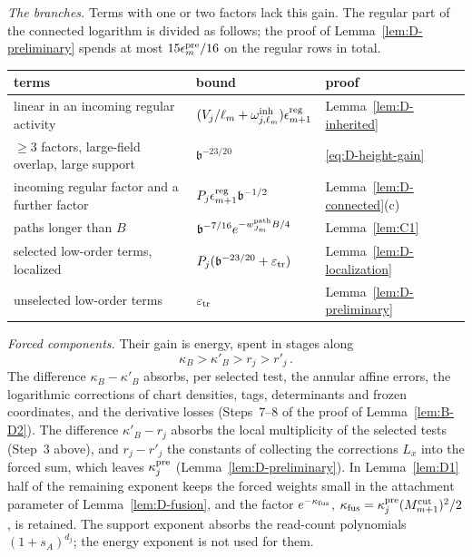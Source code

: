 \emph{The branches.} Terms with one or two factors lack this gain. The regular part of the connected logarithm is divided as follows; the proof of Lemma~\ref{lem:D-preliminary} spends at most $15\epsilon^{\rm pre}_m/16$ on the regular rows in total.
\begin{center}\small
\begin{tabular}{l|l|l}
terms & bound & proof\\\hline
linear in an incoming regular activity & $(V_j/\ell_m+\omega^{\rm inh}_{j,\ell_m})\epsilon^{\rm reg}_{m+1}$ & Lemma~\ref{lem:D-inherited}\\
$\ge3$ factors, large-field overlap, large support & $\mathfrak b^{-23/20}$ & \eqref{eq:D-height-gain}\\
incoming regular factor and a further factor & $P_j\epsilon^{\rm reg}_{m+1}\mathfrak b^{-1/2}$ & Lemma~\ref{lem:D-connected}(c)\\
paths longer than $B$ & $\mathfrak b^{-7/16}e^{-w^{\rm path}_{J_m}B/4}$ & Lemma~\ref{lem:C1}\\
selected low-order terms, localized & $P_j(\mathfrak b^{-23/20}+\varepsilon_{\rm tr})$ & Lemma~\ref{lem:D-localization}\\
unselected low-order terms & $\varepsilon_{\rm tr}$ & Lemma~\ref{lem:D-preliminary}
\end{tabular}
\end{center}

\emph{Forced components.} Their gain is energy, spent in stages along
\begin{equation*}
\kappa_B>\kappa'_B>r_j>r'_j\,.
\end{equation*}
The difference $\kappa_B-\kappa'_B$ absorbs, per selected test, the annular affine errors, the logarithmic corrections of chart densities, tags, determinants and frozen coordinates, and the derivative losses (Steps~7--8 of the proof of Lemma~\ref{lem:B-D2}). The difference $\kappa'_B-r_j$ absorbs the local multiplicity of the selected tests (Step~3 above), and $r_j-r'_j$ the constants of collecting the corrections $L_x$ into the forced sum, which leaves $\kappa_j^{\rm pre}$ (Lemma~\ref{lem:D-preliminary}). In Lemma~\ref{lem:D1} half of the remaining exponent keeps the forced weights small in the attachment parameter of Lemma~\ref{lem:D-fusion}, and the factor $e^{-\kappa_{\rm fus}}$, $\kappa_{\rm fus}=\kappa_j^{\rm pre}(M^{\mathrm{cut}}_{m+1})^2/2$, is retained. The support exponent absorbs the read-count polynomials $(1+s_A)^{d_j}$; the energy exponent is not used for them.

